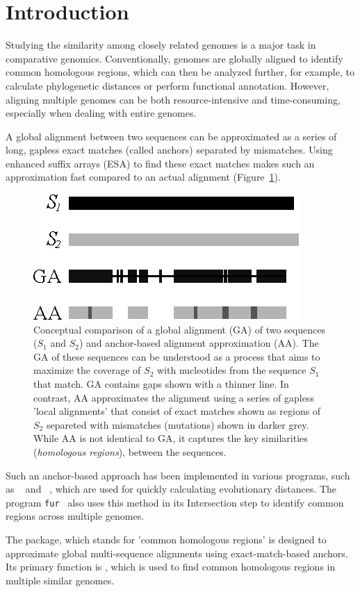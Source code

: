 \section{Introduction}

Studying the similarity among closely related genomes is a major task
in comparative genomics. Conventionally, genomes are globally aligned
to identify common homologous regions, which can then be analyzed
further, for example, to calculate phylogenetic distances or perform
functional annotation. However, aligning multiple genomes can be both
resource-intensive and time-consuming, especially when dealing with
entire genomes.

A global alignment between two sequences can be approximated as a
series of long, gapless exact matches (called anchors) separated by
mismatches. Using enhanced suffix arrays (ESA) to find these exact
matches makes such an approximation fast compared to an actual
alignment (Figure~\ref{fig:Intro1}).

\begin{figure}[H]
  \centering
    \includegraphics[width=0.5\linewidth]{figIntro1.eps}
    \caption{Conceptual comparison of a global alignment (GA) of two
      sequences ($S_1$ and $S_2$) and anchor-based alignment
      approximation (AA). The GA of these sequences can be understood
      as a process that aims to maximize the coverage of $S_2$ with
      nucleotides from the sequence $S_1$ that match. GA contains gaps
      shown with a thinner line. In contrast, AA approximates the
      alignment using a series of gapless 'local alignments' that
      consist of exact matches shown as regions of $S_2$ separeted
      with mismatches (mutations) shown in darker grey. While AA is
      not identical to GA, it captures the key similarities
      (\textit{homologous regions}), between the sequences.}
    \label{fig:Intro1}
\end{figure}

Such an anchor-based approach has been implemented in various
programs, such as ~\cite{hau15:and} and
~\cite{kloe19:phy}, which are used for quickly
calculating evolutionary distances. The program
\texttt{fur}~\cite{hau21:fur} also uses this method in its
Intersection step to identify common regions across multiple genomes.

The  package, which stands for 'common homologous regions' is
designed to approximate global multi-sequence alignments using
exact-match-based anchors. Its primary function is ,
which is used to find common homologous regions in multiple similar
genomes.
\newpage
